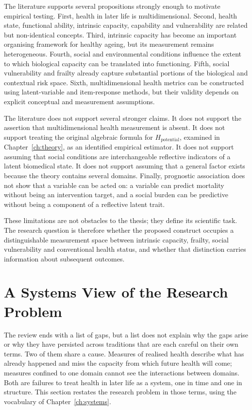 The literature supports several propositions strongly enough to motivate empirical testing. First, health in later life is multidimensional. Second, health state, functional ability, intrinsic capacity, capability and vulnerability are related but non-identical concepts. Third, intrinsic capacity has become an important organising framework for healthy ageing, but its measurement remains heterogeneous. Fourth, social and environmental conditions influence the extent to which biological capacity can be translated into functioning. Fifth, social vulnerability and frailty already capture substantial portions of the biological and contextual risk space. Sixth, multidimensional health metrics can be constructed using latent-variable and item-response methods, but their validity depends on explicit conceptual and measurement assumptions.

The literature does not support several stronger claims. It does not support the assertion that multidimensional health measurement is absent. It does not support treating the original algebraic formula for $H_{\text{potential}}$, examined in Chapter~\ref{ch:theory}, as an identified empirical estimator. It does not support assuming that social conditions are interchangeable reflective indicators of a latent biomedical state. It does not support assuming that a general factor exists because the theory contains several domains. Finally, prognostic association does not show that a variable can be acted on: a variable can predict mortality without being an intervention target, and a social burden can be predictive without being a component of a reflective latent trait.

These limitations are not obstacles to the thesis; they define its scientific task. The research question is therefore whether the proposed construct occupies a distinguishable measurement space between intrinsic capacity, frailty, social vulnerability and conventional health status, and whether that distinction carries information about subsequent outcomes.

\section{A Systems View of the Research Problem}
\label{sec:intro-systems}

The review ends with a list of gaps, but a list does not explain why the gaps arise or why they have persisted across traditions that are each careful on their own terms. Two of them share a cause. Measures of realised health describe what has already happened and miss the capacity from which future health will come; measures confined to one domain cannot see the interactions between domains. Both are failures to treat health in later life as a system, one in time and one in structure. This section restates the research problem in those terms, using the vocabulary of Chapter~\ref{ch:systems}.


